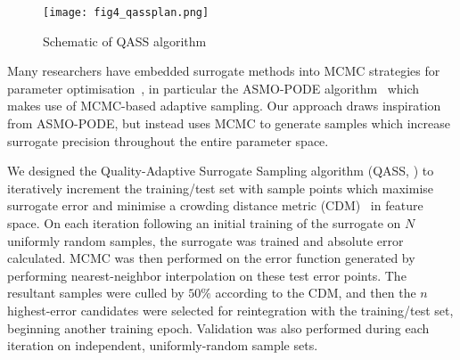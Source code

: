 \begin{figure}
	\centering
	\hspace*{-5pt}\texttt{[image: fig4\_qassplan.png]}
	\caption{\label{fig:qassplan}Schematic of QASS algorithm}
\end{figure}

Many researchers have embedded surrogate methods into MCMC strategies for
parameter optimisation~\cite{Zhang2020,Gong2017}, in particular the ASMO-PODE
algorithm~\cite{Ginting2011} which makes use of MCMC-based adaptive sampling. Our approach draws inspiration from ASMO-PODE, but instead uses MCMC to generate samples
which increase surrogate precision throughout the entire parameter space.

We designed the Quality-Adaptive Surrogate Sampling algorithm (QASS, ) to iteratively increment the training/test set with sample
points which maximise surrogate error and minimise a crowding distance metric
(CDM)~\cite{Solonen2012} in feature space. On each iteration following an initial training of the surrogate on $N$ uniformly random samples, the surrogate was trained and absolute error calculated. MCMC was then performed on the error function generated by performing nearest-neighbor interpolation on these test error points. The resultant samples were culled by $50\%$ according to the CDM, and then the $n$ highest-error candidates were selected for reintegration with the training/test set, beginning another training epoch. Validation was also performed during each iteration on independent, uniformly-random sample sets.
